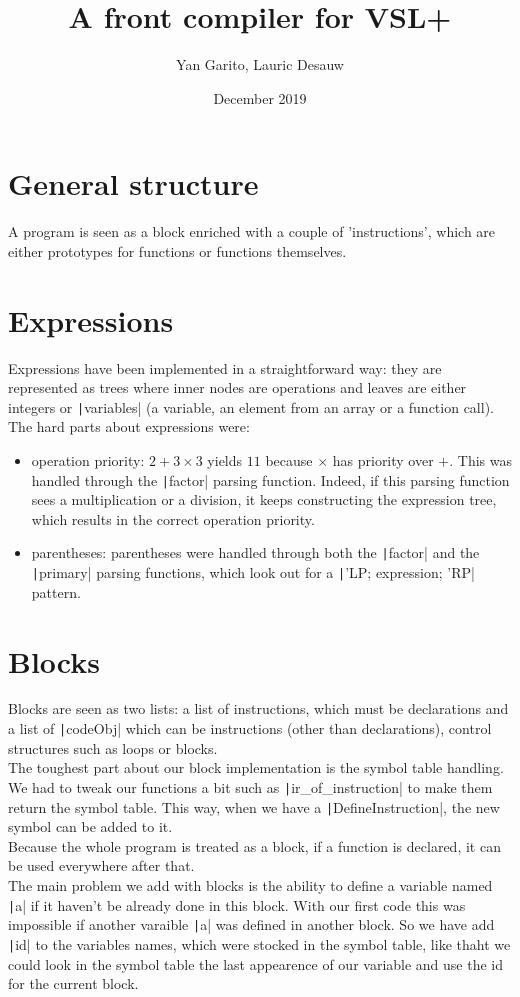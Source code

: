 \documentclass{article}
\title{A front compiler for VSL+}
\author{Yan Garito, Lauric Desauw}
\date{December 2019}
\newcommand{\code}[1]{\texttt|#1|}
\begin{document}
\maketitle


\section{General structure}

A program is seen as a block enriched with a couple of 'instructions', which are either prototypes for functions or functions themselves.


\section{Expressions}

Expressions have been implemented in a straightforward way: they are represented as trees where inner nodes are operations and leaves are either integers or \code{variables} (a variable, an element from an array or a function call). \\
The hard parts about expressions were:
\begin{itemize}

\item operation priority: $2+3 \times 3$ yields $11$ because $\times$ has priority over $+$. This was handled through the \code{factor} parsing function. Indeed, if this parsing function sees a multiplication or a division, it keeps constructing the expression tree, which results in the correct operation priority.
\item parentheses: parentheses were handled through both the \code{factor} and the \code{primary} parsing functions, which look out for a \code{'LP; expression; 'RP} pattern. 
  
\end{itemize}
  
\section{Blocks}

Blocks are seen as two lists: a list of instructions, which must be declarations and a list of \code{codeObj} which can be instructions (other than declarations), control structures such as loops or blocks. \\
The toughest part about our block implementation is the symbol table handling. We had to tweak our functions a bit such as \code{ir_of_instruction} to make them return the symbol table. This way, when we have a \code{DefineInstruction}, the new symbol can be added to it. \\
Because the whole program is treated as a block, if a function is declared, it can be used everywhere after that.  \\
The main problem we add with blocks is the ability to define a variable named \code{a} if it haven't be already done in this block. With our first code this was impossible if another varaible \code{a} was defined in another block. So we have add \code{id} to the variables names, which were stocked in the symbol table, like thaht we could look in the symbol table the last appearence of our variable and use the id for the current block. 
\end{document}
